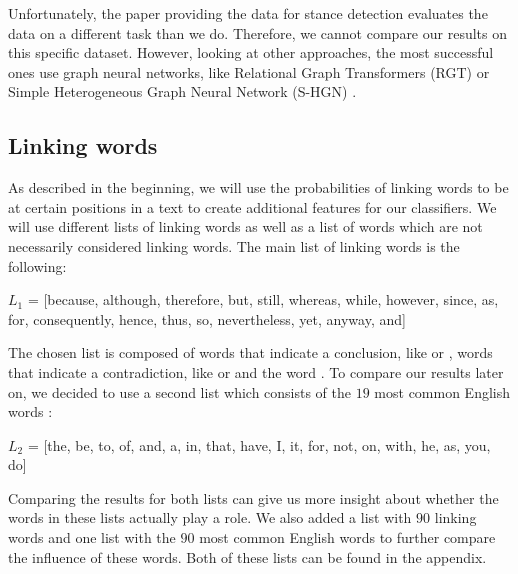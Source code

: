 Unfortunately, the paper providing the data for stance detection \cite{ibm} evaluates the data on a different task than we do. Therefore, we cannot compare our results on this specific dataset. However, looking at other approaches, the most successful ones use graph neural networks, like Relational Graph Transformers (RGT) \cite{rgt} or Simple Heterogeneous Graph Neural Network (S-HGN) \cite{shgn}.

\subsection{Linking words}
As described in the beginning, we will use the probabilities of linking words to be at certain positions in a text to create additional features for our classifiers. We will use different lists of linking words as well as a list of words which are not necessarily considered linking words. The main list of linking words is the following:

\begin{center}
	$L_1$ = [because, although, therefore, but, still, whereas, while, however, since, as, for, consequently, hence, thus, so, nevertheless, yet, anyway, and]
\end{center}

The chosen list is composed of words that indicate a conclusion, like  or , words that indicate a contradiction, like  or  and the word . To compare our results later on, we decided to use a second list which consists of the $19$ most common English words \cite{mostcommon}:
\begin{center}
	$L_2$ = [the, be, to, of, and, a, in, that, have, I, it, for, not, on, with, he, as, you, do]
\end{center}
Comparing the results for both lists can give us more insight about whether the words in these lists actually play a role. We also added a list with $90$ linking words and one list with the $90$ most common English words to further compare the influence of these words. Both of these lists can be found in the appendix.

\newpage

